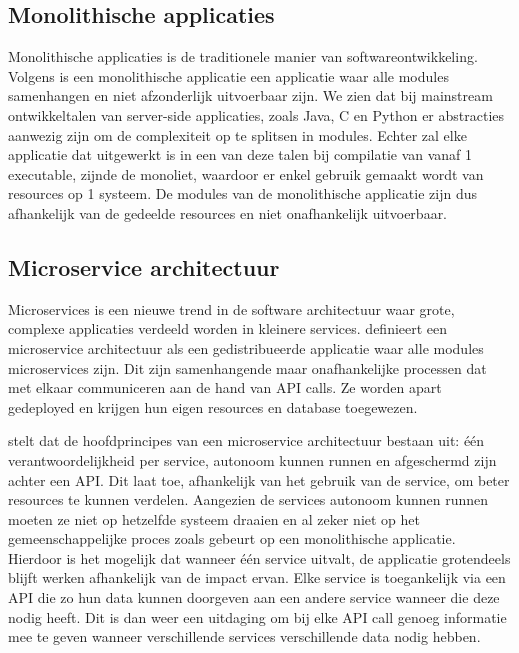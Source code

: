 \subsection{Monolithische applicaties}
Monolithische applicaties is de traditionele manier van softwareontwikkeling. Volgens \textcite{Dragoni2016} is een monolithische applicatie een applicatie waar alle modules samenhangen en niet afzonderlijk uitvoerbaar zijn. We zien dat bij mainstream ontwikkeltalen van server-side applicaties, zoals Java, C en Python er abstracties aanwezig zijn om de complexiteit op te splitsen in modules. Echter zal elke applicatie dat uitgewerkt is in een van deze talen bij compilatie van vanaf 1 executable, zijnde de monoliet, waardoor er enkel gebruik gemaakt wordt van resources op 1 systeem. De modules van de monolithische applicatie zijn dus afhankelijk van de gedeelde resources en niet onafhankelijk uitvoerbaar.

\subsection{Microservice architectuur}
Microservices is een nieuwe trend in de software architectuur waar grote, complexe applicaties verdeeld worden in kleinere services. \textcite{Dragoni2016} definieert een microservice architectuur als een gedistribueerde applicatie waar alle modules microservices zijn. Dit zijn samenhangende maar onafhankelijke processen dat met elkaar communiceren aan de hand van API calls. Ze worden apart gedeployed en krijgen hun eigen resources en database toegewezen. 

\textcite{Blinowski2022} stelt dat de hoofdprincipes van een microservice architectuur bestaan uit: één verantwoordelijkheid per service, autonoom kunnen runnen en afgeschermd zijn achter een API. Dit laat toe, afhankelijk van het gebruik van de service, om beter resources te kunnen verdelen. Aangezien de services autonoom kunnen runnen moeten ze niet op hetzelfde systeem draaien en al zeker niet op het gemeenschappelijke proces zoals gebeurt op een monolithische applicatie\autocite{Dragoni2017}. Hierdoor is het mogelijk dat wanneer één service uitvalt, de applicatie grotendeels blijft werken afhankelijk van de impact ervan. Elke service is toegankelijk via een API die zo hun data kunnen doorgeven aan een andere service wanneer die deze nodig heeft. Dit is dan weer een uitdaging om bij elke API call genoeg informatie mee te geven wanneer verschillende services verschillende data nodig hebben.

